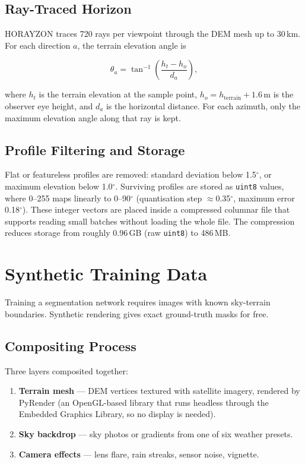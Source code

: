 \subsection{Ray-Traced Horizon}

HORAYZON traces 720 rays per viewpoint through the DEM mesh up to 30\,km. For each direction $a$, the terrain elevation angle is

\begin{equation}
\theta_a = \tan^{-1}\!\left(\frac{h_t - h_o}{d_a}\right),
\label{eq:elevation_angle}
\end{equation}

\noindent where $h_t$ is the terrain elevation at the sample point, $h_o = h_{\mathrm{terrain}} + 1.6$\,m is the observer eye height, and $d_a$ is the horizontal distance. For each azimuth, only the maximum elevation angle along that ray is kept.

\subsection{Profile Filtering and Storage}

Flat or featureless profiles are removed: standard deviation below 1.5$^\circ$, or maximum elevation below 1.0$^\circ$. Surviving profiles are stored as \texttt{uint8} values, where 0--255 maps linearly to 0--90$^\circ$ (quantisation step $\approx$0.35$^\circ$, maximum error 0.18$^\circ$). These integer vectors are placed inside a compressed columnar file that supports reading small batches without loading the whole file. The compression reduces storage from roughly 0.96\,GB (raw \texttt{uint8}) to 486\,MB.

\section{Synthetic Training Data}
\label{sec:synthetic_data}

Training a segmentation network requires images with known sky-terrain boundaries. Synthetic rendering gives exact ground-truth masks for free.

\subsection{Compositing Process}

Three layers composited together:

\begin{enumerate}
    \item \textbf{Terrain mesh} --- DEM vertices textured with satellite imagery, rendered by PyRender (an OpenGL-based library that runs headless through the Embedded Graphics Library, so no display is needed).
    \item \textbf{Sky backdrop} --- sky photos or gradients from one of six weather presets.
    \item \textbf{Camera effects} --- lens flare, rain streaks, sensor noise, vignette.
\end{enumerate}

